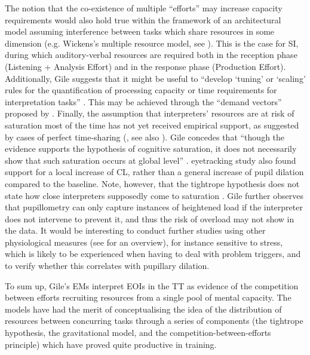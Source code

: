 The notion that the co-existence of multiple ``efforts'' may increase capacity requirements \citep[156]{gile_testing_1999} would also hold true within the framework of an architectural model assuming interference between tasks which share resources in some dimension (e.g. Wickens's multiple resource model, see ). This is the case for SI, during which auditory-verbal resources are required both in the reception phase (Listening + Analysis Effort) and in the response phase (Production Effort). Additionally, Gile suggests that it might be useful to ``develop `tuning' or `scaling' rules for the quantification of processing capacity or time requirements for interpretation tasks'' \citep[18]{gile_processing_1991}. This may be achieved through the ``demand vectors'' proposed by \citet{wickens_effects_1976,wickens_processing_1984,wickens_multiple_2002}. Finally, the assumption that interpreters' resources are at risk of saturation most of the time has not yet received empirical support, as suggested by cases of perfect time-sharing (\citealt{schumacher_virtually_2001}, see also \citealt{seeber_cognitive_2011}). Gile concedes that ``though the evidence supports the hypothesis of cognitive saturation, it does not necessarily show that such saturation occurs at global level'' \citep[61]{gile_local_2008}.  eyetracking study also found support for a local increase of CL, rather than a general increase of pupil dilation compared to the baseline. Note, however, that the tightrope hypothesis does not state how close interpreters supposedly come to saturation \citep{gile_biases_2017}. Gile further observes that pupillometry can only capture instances of heightened load if the interpreter does not intervene to prevent it, and thus the risk of overload may not show in the data. It would be interesting to conduct further studies using other physiological measures (see  for an overview), for instance sensitive to stress, which is likely to be experienced when having to deal with problem triggers, and to verify whether this correlates with pupillary dilation.

To sum up, Gile's EMs interpret EOIs in the TT as evidence of the competition between efforts recruiting resources from a single pool of mental capacity. The models have had the merit of conceptualising the idea of the distribution of resources between concurring tasks through a series of components (the tightrope hypothesis, the gravitational model, and the competition-between-efforts principle) which have proved quite productive in training.

